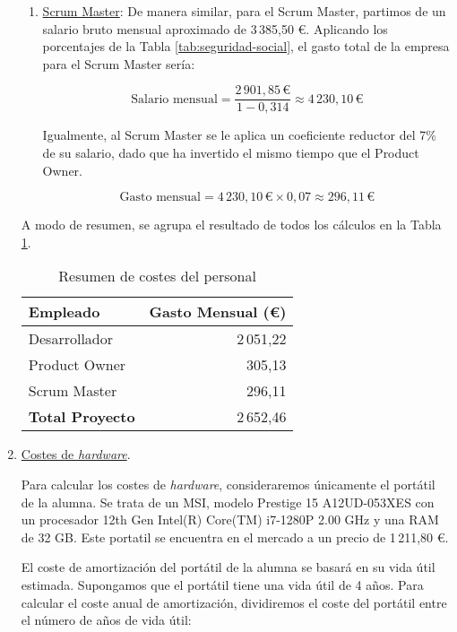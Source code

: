 \begin{enumerate}
\begin{enumerate}
        \item \underline{Scrum Master}: De manera similar, para el Scrum Master, partimos de un salario bruto mensual aproximado de 3\,385,50 €. Aplicando los porcentajes de la Tabla \ref{tab:seguridad-social}, el gasto total de la empresa para el Scrum Master sería:

        \[
        \text{{Salario mensual}} = \frac{{2\,901,85 \, \text{{€}}}}{{1 - 0,314 }} \approx 4\,230,10 \, \text{{€}}
        \]

        Igualmente, al Scrum Master se le aplica un coeficiente reductor del 7\% de su salario, dado que ha invertido el mismo tiempo que el Product Owner.
        
        \[
        \text{{Gasto mensual}} = 4\,230,10 \, \text{{€}} \times 0,07 \approx 296,11 \,\text{{€}}
        \]

    \end{enumerate}

    A modo de resumen, se agrupa el resultado de todos los cálculos en la Tabla \ref{tab:costes-empleados}.
    
\begin{table}[h]
\centering
\begin{tabularx}{300}{@{}Xr@{}}
\toprule
\textbf{Empleado}  & \textbf{Gasto Mensual (€)}\\
\midrule
Desarrollador & 2\,051,22  \\
Product Owner & 305,13 \\
Scrum Master & 296,11  \\
\midrule
\textbf{Total Proyecto} & 2\,652,46 \\
\bottomrule
\end{tabularx}
\caption{Resumen de costes del personal}
\label{tab:costes-empleados}
\end{table}


    \item \underline{Costes de \textit{hardware}}.

    Para calcular los costes de \textit{hardware}, consideraremos únicamente el portátil de la alumna.
    Se trata de un MSI, modelo Prestige 15 A12UD-053XES con un procesador 12th Gen Intel(R) Core(TM) i7-1280P 2.00 GHz y una RAM de 32 GB. Este portatil se encuentra en el mercado a un precio de 1\,211,80 €.
    
    El coste de amortización del portátil de la alumna se basará en su vida útil estimada. Supongamos que el portátil tiene una vida útil de 4 años. Para calcular el coste anual de amortización, dividiremos el coste del portátil entre el número de años de vida útil:


\end{enumerate}
